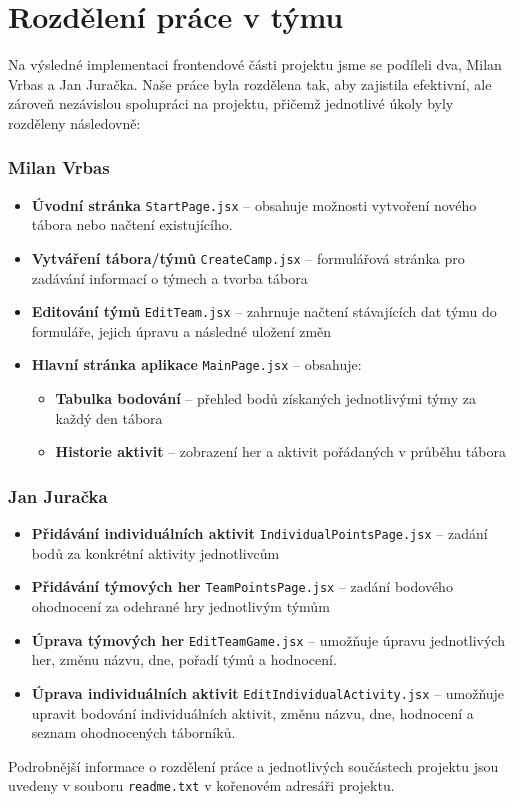 \documentclass[a4paper, 12pt]{article} %
\begin{document}
\section{Rozdělení práce v týmu}

Na výsledné implementaci frontendové části projektu jsme se podíleli dva, Milan Vrbas a 
Jan Juračka. Naše práce byla rozdělena tak, aby zajistila efektivní, ale zároveň nezávislou 
spolupráci na projektu, přičemž jednotlivé úkoly byly rozděleny následovně:

\subsubsection*{Milan Vrbas}
\begin{itemize}
    \item \textbf{Úvodní stránka} \texttt{StartPage.jsx} -- obsahuje možnosti vytvoření nového 
        tábora nebo načtení existujícího.
    \item \textbf{Vytváření tábora/týmů} \texttt{CreateCamp.jsx} -- formulářová stránka pro 
        zadávání informací o týmech a tvorba tábora
    \item \textbf{Editování týmů} \texttt{EditTeam.jsx} -- zahrnuje načtení stávajících dat 
        týmu do formuláře, jejich úpravu a následné uložení změn
    \item \textbf{Hlavní stránka aplikace} \texttt{MainPage.jsx} -- obsahuje:
    \begin{itemize}
        \item \textbf{Tabulka bodování} -- přehled bodů získaných jednotlivými týmy za každý 
            den tábora
        \item \textbf{Historie aktivit} -- zobrazení her a aktivit pořádaných v průběhu tábora
    \end{itemize}
\end{itemize}

\subsubsection*{Jan Juračka}
\begin{itemize}
    \item \textbf{Přidávání individuálních aktivit} \texttt{IndividualPointsPage.jsx} -- 
        zadání bodů za konkrétní aktivity jednotlivcům
    \item \textbf{Přidávání týmových her} \texttt{TeamPointsPage.jsx} -- zadání bodového 
        ohodnocení za odehrané hry jednotlivým týmům
    \item \textbf{Úprava týmových her} \texttt{EditTeamGame.jsx} -- umožňuje úpravu jednotlivých her, změnu názvu, dne, pořadí týmů a hodnocení.
    \item \textbf{Úprava individuálních aktivit} \texttt{EditIndividualActivity.jsx} -- umožňuje upravit bodování individuálních aktivit, změnu názvu, dne, hodnocení a seznam ohodnocených táborníků.
\end{itemize}
Podrobnější informace o rozdělení práce a jednotlivých součástech projektu jsou uvedeny v 
souboru \texttt{readme.txt} v kořenovém adresáři projektu.
\end{document}
